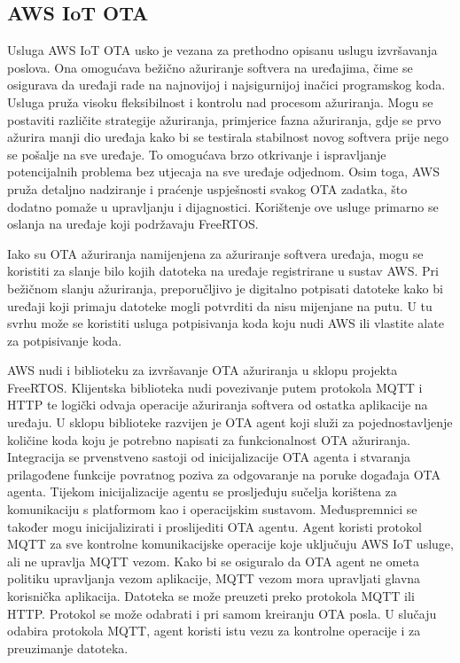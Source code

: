 \subsection{AWS IoT OTA}

Usluga AWS IoT OTA  usko je vezana za prethodno opisanu uslugu izvršavanja poslova. Ona omogućava bežično ažuriranje softvera na uređajima, čime se osigurava da uređaji rade na najnovijoj i najsigurnijoj inačici programskog koda. Usluga pruža visoku fleksibilnost i kontrolu nad procesom ažuriranja. Mogu se postaviti različite strategije ažuriranja, primjerice fazna ažuriranja, gdje se prvo ažurira manji dio uređaja kako bi se testirala stabilnost novog softvera prije nego se pošalje na sve uređaje. To omogućava brzo otkrivanje i ispravljanje potencijalnih problema bez utjecaja na sve uređaje odjednom. Osim toga, AWS pruža detaljno nadziranje i praćenje uspješnosti svakog OTA zadatka, što dodatno pomaže u upravljanju i dijagnostici. Korištenje ove usluge primarno se oslanja na uređaje koji podržavaju FreeRTOS. 

Iako su OTA ažuriranja namijenjena za ažuriranje softvera uređaja, mogu se koristiti za slanje bilo kojih datoteka na uređaje registrirane u sustav AWS. Pri bežičnom slanju ažuriranja, preporučljivo je digitalno potpisati datoteke kako bi uređaji koji primaju datoteke mogli potvrditi da nisu mijenjane na putu. U tu svrhu može se koristiti usluga potpisivanja koda koju nudi AWS ili vlastite alate za potpisivanje koda. 

AWS nudi i biblioteku za izvršavanje OTA ažuriranja u sklopu projekta FreeRTOS. Klijentska biblioteka nudi povezivanje putem protokola MQTT i HTTP te logički odvaja operacije ažuriranja softvera od ostatka aplikacije na uređaju. U sklopu biblioteke razvijen je OTA agent koji služi za pojednostavljenje količine koda koju je potrebno napisati za funkcionalnost OTA ažuriranja. Integracija se prvenstveno sastoji od inicijalizacije OTA agenta i stvaranja prilagođene funkcije povratnog poziva za odgovaranje na poruke događaja OTA agenta. Tijekom inicijalizacije agentu se prosljeđuju sučelja korištena za komunikaciju s platformom kao i operacijskim sustavom. Međuspremnici  se također mogu inicijalizirati i proslijediti OTA agentu. Agent koristi protokol MQTT za sve kontrolne komunikacijske operacije koje uključuju AWS IoT usluge, ali ne upravlja MQTT vezom. Kako bi se osiguralo da OTA agent ne ometa politiku upravljanja vezom aplikacije, MQTT vezom mora upravljati glavna korisnička aplikacija. Datoteka se može preuzeti preko protokola MQTT ili HTTP. Protokol se može odabrati i pri samom kreiranju OTA posla. U slučaju odabira protokola MQTT, agent koristi istu vezu za kontrolne operacije i za preuzimanje datoteka.

